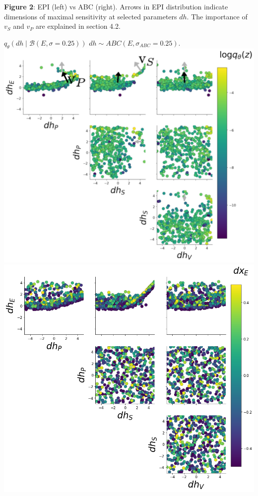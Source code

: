 \documentclass[11pt]{article}
\begin{document}
 \textbf{Figure 2}: EPI (left) vs ABC (right).  Arrows in EPI distribution indicate dimensions of maximal sensitivity at selected parameters $dh$. The importance of $v_S$ and $v_P$ are explained in section 4.2. \\
\begin{center}
$q_\theta(dh \mid \mathcal{B}(E,\sigma=0.25))$ \hspace{1.2in} $dh \sim ABC(E,\sigma_{ABC}=0.25)$. \\
\includegraphics[scale=0.25]{figs/V1_drdh_EPI_E.pdf} 
\includegraphics[scale=0.25]{figs/V1_drdh_ABC_E.png} \\

\end{center}
\end{document}
